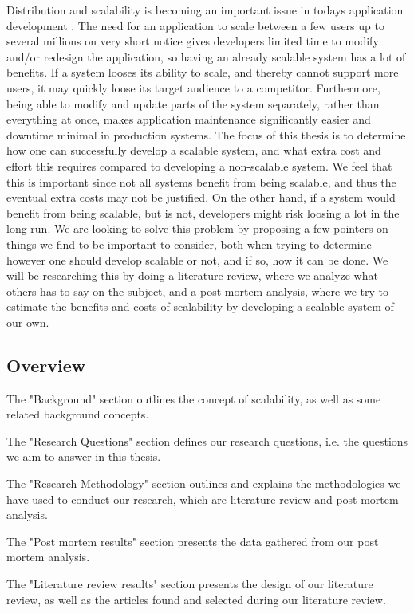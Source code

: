 \documentclass{article}
\begin{document}
Distribution and scalability is becoming an important issue in todays
application development \cite{rellermeyer2007services}.
The need for an application to scale between a few users up to several millions 
on very short notice gives developers limited time to modify and/or redesign 
the application, so having an already scalable system has a lot of benefits. 
If a system looses its ability to scale, and thereby cannot support more users, 
it may quickly loose its target audience to a competitor. Furthermore, being able 
to modify and update parts of the system separately, rather than everything at 
once, makes application maintenance significantly easier and downtime minimal 
in production systems. The focus of this thesis is to determine how one can
successfully develop a scalable system, and what extra cost and effort this
requires compared to developing a non-scalable system. We feel that this is
important since not all systems benefit from being scalable, and thus the
eventual extra costs may not be justified. On the other hand, if a system would
benefit from being scalable, but is not, developers might risk loosing a lot in
the long run. We are looking to solve this problem by proposing a few pointers
on things we find to be important to consider, both when trying to determine
however one should develop scalable or not, and if so, how it can be done. We
will be researching this by doing a literature review, where we analyze what
others has to say on the subject, and a post-mortem analysis, where we try to
estimate the benefits and costs of scalability by developing a scalable system
of our own.

\subsection{Overview}

The "Background" section outlines the concept of scalability, as well as some
related background concepts.

The "Research Questions" section defines our research questions, i.e. the
questions we aim to answer in this thesis.

The "Research Methodology" section outlines and explains the methodologies we
have used to conduct our research, which are literature review and post mortem
analysis.

The "Post mortem results" section presents the data gathered from our post
mortem analysis.

The "Literature review results" section presents the design of our literature
review, as well as the articles found and selected during our literature
review.
\end{document}
